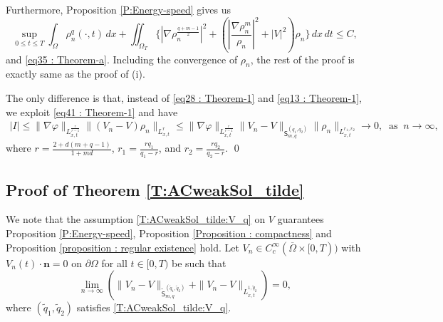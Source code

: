 \documentclass{amsart}
\numberwithin{equation}{section}
\newcommand{\abs}[1]{\left| #1 \right|}
\begin{document}
Furthermore, Proposition \ref{P:Energy-speed} gives us
 \begin{equation*}\label{eq12 : Theorem-2-a}
 \sup_{0\leq t \leq T}  \int_{\Omega} \rho_n^q(\cdot, t) \,dx
 + \iint_{\Omega_T} \{ \abs{\nabla \rho_n^{\frac{q+m-1}{2}}}^2  + \left(\abs{\frac{\nabla
\rho_n^m}{\rho_n}}^{2}+|V|^{2}\right ) \rho_n  \}\,dx\,dt \leq C,
\end{equation*}
and \eqref{eq35 : Theorem-a}. Including the convergence of $\rho_n$, the rest of the proof is exactly same as the proof of (i). 

The only difference is that, instead of \eqref{eq28 : Theorem-1} and \eqref{eq13 : Theorem-1}, we exploit \eqref{eq41 : Theorem-1}
 and have
\begin{equation}\label{eq34 : Theorem-1}
\begin{aligned}
| I | \leq \| \nabla \varphi \|_{L_{x,t}^{\frac{r}{r-1}}} \| (V_n-V)\rho_n\|_{L_{x,t}^r} 
 \leq  \| \nabla \varphi \|_{L_{x,t}^{\frac{r}{r-1}}} \|V_n-V\|_{\mathsf{S}_{m,q}^{(q_1,q_2)}} \|\rho_n\|_{L^{r_1, r_2}_{x,t}}  
 \longrightarrow 0, \ \mbox{ as } \  n\rightarrow \infty,
\end{aligned}
\end{equation}
where $r= \frac{2+d(m+q-1)}{1+md}$, $r_1=\frac{r q_1}{q_1-r}$, and $r_2=\frac{r q_2}{q_2-r} $. 
\qed


\subsection{Proof of Theorem \ref{T:ACweakSol_tilde}}
We note that the assumption \eqref{T:ACweakSol_tilde:V_q} on $V$ guarantees Proposition \ref{P:Energy-speed},  Proposition \ref{Proposition : compactness} and Proposition \ref{proposition : regular existence} hold. Let $V_n\in C^\infty_c(\overline{\Omega}\times[0,T)) $ with $V_n(t)\cdot \mathbf{n}=0$ on $\partial\Omega$ for all $t\in[0,T)$ be
such that
\begin{equation*}\label{eq7 : T:weakSol_tilde}
\lim_{n \rightarrow \infty} \left (\|V_n - V \|_{\tilde{\mathsf{S}}_{m,q}^{(\tilde{q}_1,\tilde{q}_2)}}  +  \|V_n - V \|_{L_{x,t}^{1,\tilde{q}_2} }\right)=0,
\end{equation*}
 where $(\tilde{q}_1, \tilde{q}_2)$ satisfies \eqref{T:ACweakSol_tilde:V_q}. 
\end{document}
